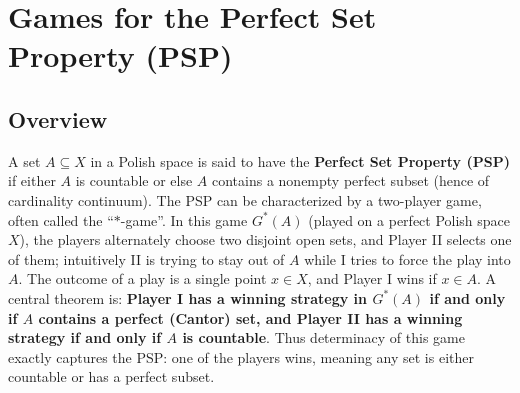\documentclass[11pt]{article}
\begin{document}
\section{Games for the Perfect Set Property (PSP)}
\label{games-for-the-perfect-set-property-psp}
\subsection{Overview}
\label{overview-4}
A set \(A\subseteq X\) in a Polish space is said to have the \textbf{Perfect
Set Property (PSP)} if either \(A\) is countable or else \(A\) contains
a nonempty perfect subset (hence of cardinality continuum). The PSP can
be characterized by a two-player game, often called the “\(\ast\)-game”.
In this game \(G^*(A)\) (played on a perfect Polish space \(X\)), the
players alternately choose two disjoint open sets, and Player II selects
one of them; intuitively II is trying to stay out of \(A\) while I tries
to force the play into \(A\). The outcome of a play is a single point
\(x\in X\), and Player I wins if \(x\in A\). A central theorem is:
\textbf{Player I has a winning strategy in \(G^*(A)\) if and only if \(A\)
contains a perfect (Cantor) set, and Player II has a winning strategy if
and only if \(A\) is countable}. Thus determinacy of this game exactly
captures the PSP: one of the players wins, meaning any set is either
countable or has a perfect subset.
\end{document}
